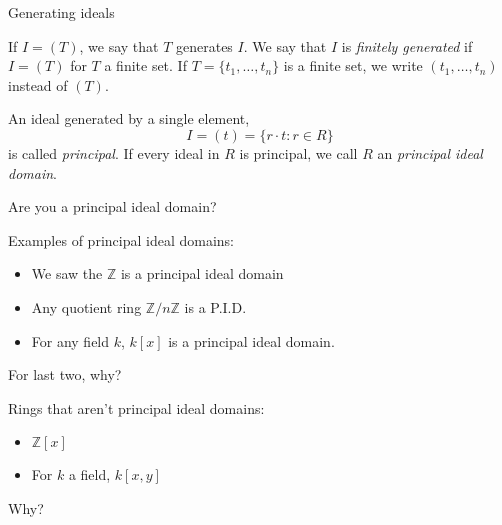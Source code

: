 \documentclass{beamer}
\begin{document}
\begin{frame}{Generating ideals}

\begin{definition} If $I=(T)$, we say that $T$ generates $I$.  We say that $I$ is \emph{finitely generated} if $I=(T)$ for $T$ a finite set.  If $T=\{t_1,\dots, t_n\}$ is a finite set, we write $(t_1,\dots, t_n)$ instead of $(T)$.
\end{definition}

\begin{definition} An ideal generated by a single element, 
$$I=(t)=\{r\cdot t: r\in R\}$$
is called \emph{principal}.  If every ideal in $R$ is principal, we call $R$ an \emph{principal ideal domain}.
\end{definition}

\end{frame}


\begin{frame}{Are you a principal ideal domain?}

\begin{block}{Examples of principal ideal domains:}
\begin{itemize}
\item We saw the $\mathbb{Z}$ is a principal ideal domain
\item Any quotient ring $\mathbb{Z}/n\mathbb{Z}$ is a P.I.D.
\item For any field $k$, $k[x]$ is a principal ideal domain.
\end{itemize}
For last two, why?
\end{block}

\begin{block}{Rings that aren't principal ideal domains:}
\begin{itemize}
\item $\mathbb{Z}[x]$
\item For $k$ a field, $k[x,y]$
\end{itemize}
Why?
\end{block}


\end{frame}
\end{document}
